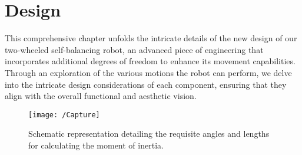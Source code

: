 \chapter{Design}

\graphicspath{{./Figures/Design}}

This comprehensive chapter unfolds the intricate details of the new design of our two-wheeled self-balancing robot, an advanced piece of engineering that incorporates additional degrees of freedom to enhance its movement capabilities. Through an exploration of the various motions the robot can perform, we delve into the intricate design considerations of each component, ensuring that they align with the overall functional and aesthetic vision. 


\begin{figure}[h]
	\centering
	\texttt{[image: /Capture]}
	\caption[Moment of inertia Schematic representation]{Schematic representation detailing the requisite angles and lengths for calculating the moment of inertia.}
	\label{fig:Schematic representation detailing the requisite angles and lengths for calculating the moment of inertia.}
\end{figure}
\newpage
